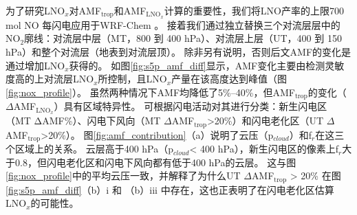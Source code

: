 为了研究LNO$_x$对AMF$_\textrm{trop}$和AMF$_\textrm{LNO$_x$}$计算的重要性，我们将LNO产率的上限700 mol NO 每闪电\citep{Ott.2010}应用于WRF-Chem 。
接着我们通过独立替换三个对流层层中的NO$_2$廓线：对流层中层（MT，800 到 400 hPa）、对流层上层（UT，400 到 150 hPa）和整个对流层（地表到对流层顶）。
除非另有说明，否则后文AMF的变化是通过增加LNO$_x$获得的。
如图\ref{fig:s5p_amf_diff}显示，AMF变化主要由检测灵敏度高的上对流层LNO$_x$所控制\citep{Beirle.2009,Laughner.2017}，且LNO$_x$产量在该高度达到峰值（图\ref{fig:nox_profile}）。
虽然两种情况下AMF均降低了5\%--40\%，但AMF$_\textrm{trop}$的变化（$\Delta$AMF$_\textrm{LNO$_x$}$）具有区域特异性。
可根据闪电活动对其进行分类：新生闪电区（MT ΔAMF\%）、闪电下风向（MT $\Delta$AMF$_\textrm{trop}$>20\%）和闪电老化区（UT $\Delta$AMF$_\textrm{trop}$>20\%）。
图\ref{fig:amf_contribution}（a）说明了云压（p$_{cloud}$）和f$_r$在这三个区域上的关系。
云层高于400 hPa（p$_{cloud}$< 400 hPa），新生闪电区的像素上f$_r$大于0.8，但闪电老化区和闪电下风向都有低于400 hPa的云层。
这与图\ref{fig:nox_profile}中的平均云压一致，并解释了为什么UT $\Delta$AMF$_\textrm{trop}$ > 20\% 在图\ref{fig:s5p_amf_diff}（b）i 和 （b）iii 中存在，这也正表明了在闪电老化区估算LNO$_x$的可能性。


